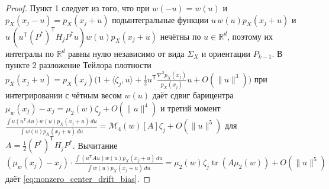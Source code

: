 \documentclass[11pt,a4paper]{article}
\newcommand{\R}{\mathbb{R}}
\newcommand{\T}{^{\mathsf{T}}}
\newcommand{\PEDRs}{P^{*}}
\DeclareMathOperator{\tr}{tr}
\theoremstyle{definition}
\theoremstyle{remark}
\begin{document}
\begin{proof}
Пункт 1 следует из того, что при $w(-u) = w(u)$ и $p_X(x_j - u) = p_X(x_j + u)$ подынтегральные функции $u \, w(u) p_X(x_j + u)$ и $u \, (u\T (\PEDRs)\T H_j \PEDRs u) w(u) p_X(x_j + u)$ нечётны по $u \in \R^d$, поэтому их интегралы по $\R^d$ равны нулю независимо от вида $\Sigma_X$ и ориентации $P_{k-1}$.
В пункте 2 разложение Тейлора плотности $p_X(x_j + u) = p_X(x_j)\bigl(1 + \langle \zeta_j, u\rangle + \frac{1}{2}u\T \frac{\nabla^2 p_X(x_j)}{p_X(x_j)} u + O(\|u\|^3)\bigr)$ при интегрировании с чётным весом $w(u)$ даёт сдвиг барицентра $\mu_w(x_j) - x_j = \mu_2(w)\zeta_j + O(\|u\|^4)$ и третий момент $\frac{\int u (u\T A u) w(u) p_X(x_j + u)\,du}{\int w(u) p_X(x_j + u)\,du} = \mathcal{M}_4(w)[A]\zeta_j + O(\|u\|^5)$ для $A = \frac{1}{2}(\PEDRs)\T H_j \PEDRs$. Вычитание $(\mu_w(x_j) - x_j) \cdot \frac{\int (u\T A u) w(u) p_X(x_j+u)\,du}{\int w(u) p_X(x_j+u)\,du} = \mu_2(w)\zeta_j \tr(A \mu_2(w)) + O(\|u\|^5)$ даёт \eqref{eq:nonzero_center_drift_bias}.
\end{proof}
\end{document}
